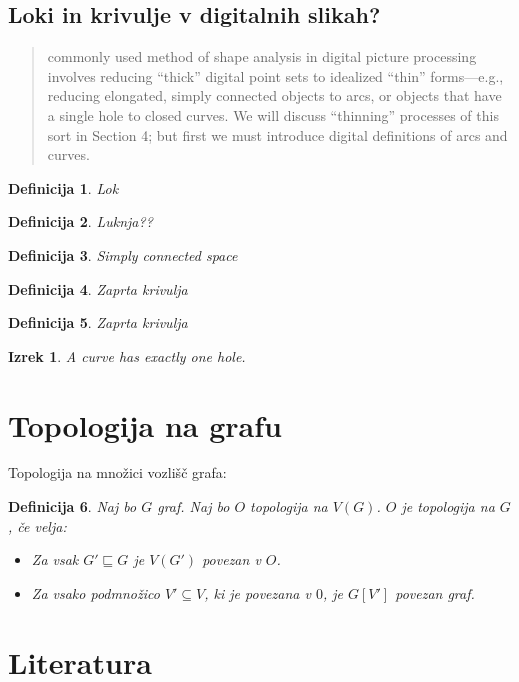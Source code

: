 \documentclass[mat1, tisk]{fmfdelo}
\newtheorem{definition}{Definicija}[subsection]
\newtheorem{theorem}{Izrek}[subsection]
\begin{document}
\subsection{Loki in krivulje v digitalnih slikah?}
\begin{quote}
  commonly used method of shape analysis in digital picture processing involves
  reducing ``thick'' digital point sets to idealized ``thin'' forms---e.g., reducing
  elongated, simply connected objects to arcs, or objects that have a single hole
  to closed curves. We will discuss ``thinning'' processes of this sort in Section 4;
  but first we must introduce digital definitions of arcs and curves.
\end{quote}
\begin{definition}
  Lok
\end{definition}
\begin{definition}
  Luknja??
\end{definition}
\begin{definition}
  Simply connected space
\end{definition}
\begin{definition}
  Zaprta krivulja
\end{definition}
\begin{definition}
  Zaprta krivulja
\end{definition}
\begin{theorem}
  A curve has exactly one hole.
\end{theorem}
\section{Topologija na grafu}
Topologija na množici vozlišč grafa:\\
\nocite{*}



\begin{definition}
  Naj bo $G$ graf. Naj bo $O$ topologija na $V(G)$. $O$ je topologija na $G$, če velja:
  \begin{itemize}
    \item[(1)] Za vsak $G' \sqsubseteq G$ je $V(G')$ povezan v $O$.
    \item[(2)] Za vsako podmnožico $V' \subseteq V$, ki je povezana v $0$, je $G[V']$ povezan graf. 
  \end{itemize}
\end{definition}

\cleardoublepage
\section{Literatura}

\newpage
\end{document}
